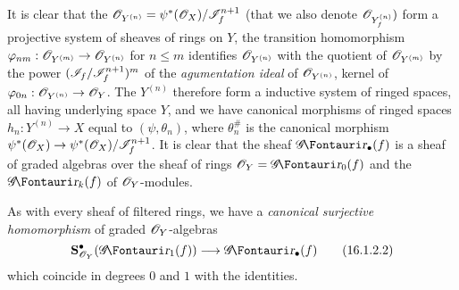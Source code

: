 It is clear that the $\mathscr{O}_{Y^{(n)}} = \psi^*(\mathscr{O}_X)/\mathscr{I}_f^{n+1}$ (that we also denote $\mathscr{O}_{Y_f^{(n)}})$ form a
projective system of sheaves of rings on $Y$, the transition homomorphism $\varphi_{nm}:\sh{O}_{Y^{(m)}} \to \sh{O}_{Y^{(n)}}$ for $n \leq m$ identifies $\mathscr{O}_{Y^{(n)}}$ with the quotient of $\mathscr{O}_{Y^{(m)}}$ by the power $(\mathscr{I}_f/\mathscr{I}_f^{n+1} )^m$ of the \emph{agumentation ideal} of $\mathscr{O}_{Y^{(n)}}$, kernel of $\varphi_{0n}: \sh{O}_{Y^{(n)}} \to \sh{O}_{Y}$.
The $Y^{(n)}$ therefore form a inductive system of ringed spaces, all having underlying space $Y$, and we have canonical morphisms of ringed spaces $h_n: Y^{(n)} \to X$ equal to $(\psi, \theta_n)$, where $\theta^\#_n$ is the canonical morphism $\psi^*(\sh{O}_X) \to \psi^*(\sh{O}_X)/\sh{I}_f^{n+1}$.
It is clear that the sheaf $\shGr_\bullet(f)$ is a sheaf of graded algebras over the sheaf of rings $\sh{O}_Y = \shGr_0(f)$ and the $\shGr_k(f)$ of $\mathscr{O}_Y$-modules.

As with every sheaf of filtered rings, we have a \emph{canonical surjective homomorphism} of graded $\mathscr{O}_Y$-algebras
\[
  \label{IV.16.1.2.2}
  \bb{S}_{\sh{O}_Y}^\bullet(\shGr_1(f)) \to \shGr_\bullet(f)
  \tag{16.1.2.2}
\]
which coincide in degrees $0$ and $1$ with the identities.


